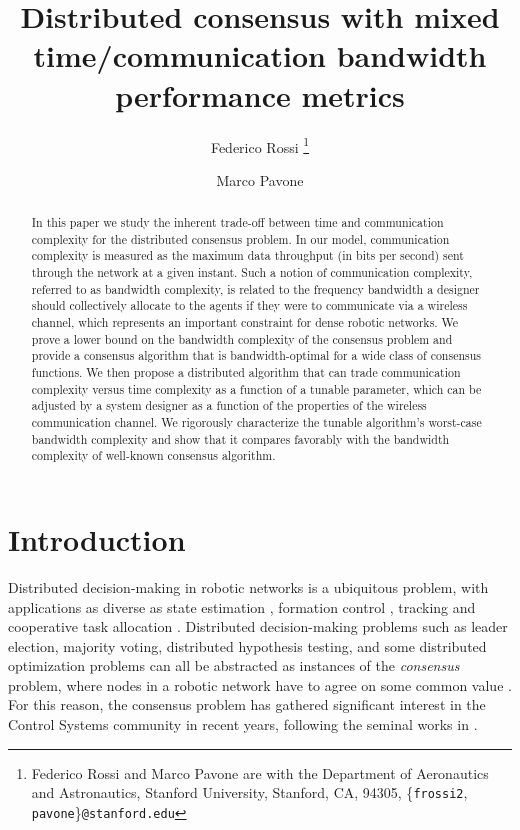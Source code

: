 \documentclass[letterpaper,10pt,conference]{ieeeconf}
\title{Distributed consensus with mixed time/communication bandwidth
      performance metrics}
\author{Federico Rossi \thanks{Federico Rossi and Marco Pavone are  with the Department of Aeronautics and Astronautics, Stanford University, Stanford, CA, 94305, \{{\tt\small frossi2}, {\tt\small pavone}\}{\tt \small @stanford.edu}} \and Marco Pavone}
\begin{document}
\maketitle
\thispagestyle{empty}
\pagestyle{empty}


\begin{abstract}
In this paper we study the inherent trade-off between time and communication complexity for the distributed consensus problem. In our model, communication complexity is measured as the maximum data throughput (in bits per second) sent through the network at a given instant. Such a notion of communication complexity, referred to as bandwidth complexity, is related to the frequency bandwidth a designer should collectively allocate to the agents if they were to communicate via a wireless channel, which represents an important constraint for dense robotic networks. We prove  a lower bound on the bandwidth complexity of the consensus problem and provide a consensus algorithm that is bandwidth-optimal for a wide class of consensus functions. We then propose a distributed algorithm that can trade communication complexity versus time complexity as a function of a tunable parameter, which can be adjusted by a system designer as a function of the properties of the wireless communication channel.  We rigorously characterize the tunable algorithm's worst-case bandwidth complexity and show that it compares favorably with the bandwidth complexity of well-known consensus algorithm.
\end{abstract}

\section{Introduction}
Distributed decision-making in robotic networks is a ubiquitous problem, with applications as diverse as state estimation \cite{ROS:07}, formation control \cite{WR-RWB-EMA:07}, tracking \cite{YH-JH-LG:06} and cooperative task allocation \cite{MdW-BC:09}. Distributed decision-making problems such as leader election, majority voting, distributed  hypothesis testing, and some distributed optimization problems can all be abstracted as instances of the \emph{consensus} problem, where nodes in a robotic network have to agree on some common value \cite{JNT-MA:85,NL:96}. 
For this reason, the consensus problem has gathered significant interest in the Control Systems community in recent years, following the seminal works in \cite{JNT:84-extra, ROS-RMM:03c,AJ-JL-ASM:02}.
\end{document}
